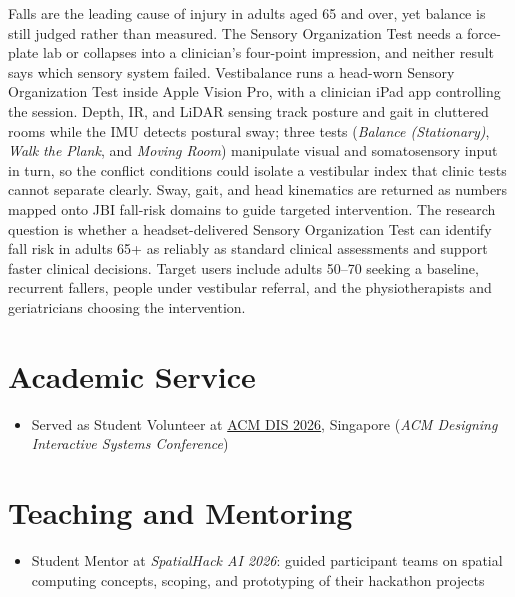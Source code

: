 \documentclass[12pt]{article}
\begin{document}
Falls are the leading cause of injury in adults aged 65 and over, yet balance is still judged rather than measured. The Sensory Organization Test needs a force-plate lab or collapses into a clinician's four-point impression, and neither result says which sensory system failed. Vestibalance runs a head-worn Sensory Organization Test inside Apple Vision Pro, with a clinician iPad app controlling the session. Depth, IR, and LiDAR sensing track posture and gait in cluttered rooms while the IMU detects postural sway; three tests (\textit{Balance (Stationary)}, \textit{Walk the Plank}, and \textit{Moving Room}) manipulate visual and somatosensory input in turn, so the conflict conditions could isolate a vestibular index that clinic tests cannot separate clearly. Sway, gait, and head kinematics are returned as numbers mapped onto JBI fall-risk domains to guide targeted intervention. The research question is whether a headset-delivered Sensory Organization Test can identify fall risk in adults 65+ as reliably as standard clinical assessments and support faster clinical decisions. Target users include adults 50--70 seeking a baseline, recurrent fallers, people under vestibular referral, and the physiotherapists and geriatricians choosing the intervention.

\section{Academic Service}

\begin{itemize}[leftmargin=1.5em]
    \item Served as Student Volunteer at
          \href{https://dis.acm.org/2026/}{ACM DIS 2026}, Singapore
          (\textit{ACM Designing Interactive Systems Conference})
\end{itemize}

\section{Teaching and Mentoring}

\begin{itemize}[leftmargin=1.5em]
    \item Student Mentor at \textit{SpatialHack AI 2026}: guided participant teams on spatial computing concepts, scoping, and prototyping of their hackathon projects
\end{itemize}
\end{document}
